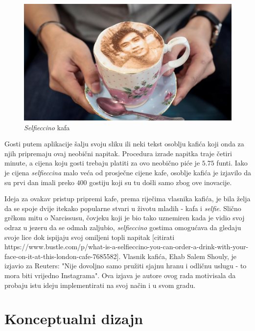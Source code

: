 \documentclass[12pt]{article}
\begin{document}
\begin{figure}[!h]
\centering
\includegraphics[scale=0.3]{slika_1}
\caption{\textit{Selfieccino} kafa}
\label{slika_1}
\end{figure}

Gosti putem aplikacije \v{s}alju svoju sliku ili neki tekst osoblju kafi\'ca koji onda za njih pripremaju ovaj neobi\v{c}ni napitak. Procedura izrade napitka traje \v{c}etiri minute, a cijena koju gosti trebaju platiti za ovo neobi\v{c}no pi\'ce je $5.75$ funti. Iako je cijena \textit{selfieccina} malo ve\'ca od prosje\v{c}ne cijene kafe, osoblje kafi\'ca je izjavilo da su prvi dan imali preko $400$ gostiju koji su tu do\v{s}li samo zbog ove inovacije.

Ideja za ovakav pristup pripremi kafe, prema rije\v{c}ima vlasnika kafi\'ca, je bila \v{z}elja da se spoje dvije itekako popularne stvari u \v{z}ivotu mladih - kafa i \textit{selfie}. Slično grčkom mitu o Narcissusu, čovjeku koji je bio tako uznemiren kada je vidio svoj odraz u jezeru da se odmah zaljubio, \textit{selfieccino} gostima omogućava da gledaju svoje lice dok ispijaju svoj omiljeni topli napitak [citirati https://www.bustle.com/p/what-is-a-selfieccino-you-can-order-a-drink-with-your-face-on-it-at-this-london-cafe-7685582]. Vlasnik kafi\'ca, Ehab Salem Shouly, je izjavio za Reuters: "Nije dovoljno samo pružiti sjajnu hranu i odličnu uslugu - to mora biti vrijedno Instagrama". Ova izjava je autore ovog rada motivisala da probaju istu ideju implementirati na svoj na\v{c}in i u svom gradu. 

\newpage

\section{Konceptualni dizajn}
\end{document}
